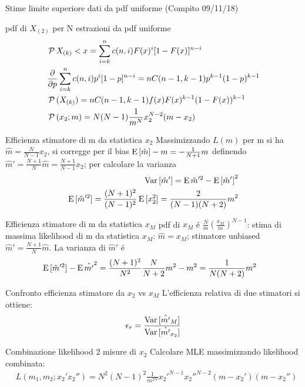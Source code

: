\begin{wordonframe}{Stime limite superiore dati da pdf uniforme (Compito 09/11/18)}
\begin{block}{pdf di $X_{(2)}$ per N estrazioni da pdf uniforme}
\begin{align*}
&\operatorname{\mathcal{P}}{X_{(k)}<x}=\sum_{i=k}^nc(n,i)F(x)^i[1-F(x)]^{n-i}\\
&\frac{\partial}{\partial p}\sum_{i=k}^nc(n,i)p^{i}[1-p]^{n-i}=nC(n-1,k-1)p^{k-1}(1-p)^{k-1}\\
&\operatorname{\mathcal{P}}{(X_{(k)})}=nC(n-1,k-1)f(x)F(x)^{k-1}(1-F(x))^{k-1}\\
&\operatorname{\mathcal{P}}{(x_2;m)}=N(N-1)\frac{1}{m^N}x_2^{N-2}(m-x_2)
\end{align*}
\end{block}
\begin{block}{Efficienza stimatore di m da statistica $x_2$}
Massimizzando $L(m)$ per m si ha $\hat{m}=\frac{N}{N-1}x_2$, si corregge per il bias $\operatorname{E}{[\hat{m}]}-m=-\frac{1}{N+1}m$ definendo $\hat{m}'=\frac{N+1}{N}\hat{m}=\frac{N+1}{N-1}x_2$; per calcolare la varianza
\begin{align*}
\operatorname{Var}{[\hat{m}']}=\operatorname{E}{\hat{m}'^2}-\operatorname{E}{[\hat{m}']}^2\\
\operatorname{E}{[\hat{m}'^2]}=\frac{(N+1)^2}{(N-1)^2}\operatorname{E}{[x_2^2]}=\frac{2}{(N-1)(N+2)}m^2
\end{align*}
\end{block}
\begin{block}{Efficienza stimatore di m da statistica $x_M$}
pdf di $x_M$ \'e $\frac{N}{m}(\frac{x_M}{m})^{N-1}$: stima di massima likelihood di m da statistica $x_M$: $\hat{m}=x_M$; stimatore unbiased $\hat{m}'=\frac{N+1}{N}\hat{m}$.
La varianza di $\hat{m}'$ \'e
\begin{align*}
&\operatorname{E}{[\hat{m}'^2]}-\operatorname{E}{\hat{m'}}^2=\frac{(N+1)^2}{N^2}\frac{N}{N+2}m^2-m^2=\frac{1}{N(N+2)}m^2
\end{align*}
\end{block}
\begin{block}{Confronto efficienza stimatore da $x_2$ vs $x_M$}
L'efficienza relativa di due stimatori si ottiene:
\begin{equation*}
\epsilon_r=\frac{\operatorname{Var}{[\hat{m'}_{M}]}}{\operatorname{Var}{[\hat{m'}_{x_2}]}}
\end{equation*}
\end{block}
\begin{block}{Combinazione likelihood 2 misure di $x_2$}
Calcolare MLE massimizzando likelihood combinata:
\begin{align*}
&L(m_1,m_2;x_2'x_2'')=N^2(N-1)^2\frac{1}{m^{2N}}{x_2'}^{N-1}{x_2''}^{N-2}(m-x_2')(m-x_2'')\\

\end{align*}
\end{block}
\end{wordonframe}
